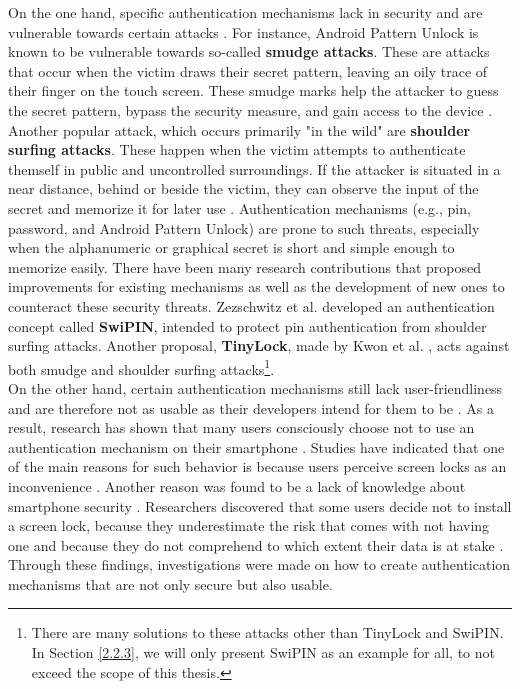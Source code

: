 On the one hand, specific authentication mechanisms lack in security and are vulnerable towards certain attacks \cite{Schloeglhofer}. For instance, Android Pattern Unlock is known to be vulnerable towards so-called \textbf{smudge attacks}. These are attacks that occur when the victim draws their secret pattern, leaving an oily trace of their finger on the touch screen. These smudge marks help the attacker to guess the secret pattern, bypass the security measure, and gain access to the device \cite{ediss20251}. Another popular attack, which occurs primarily "in the wild" are \textbf{shoulder surfing attacks}. These happen when the victim attempts to authenticate themself in public and uncontrolled surroundings. If the attacker is situated in a near distance, behind or beside the victim, they can observe the input of the secret and memorize it for later use \cite{ediss20251}. Authentication mechanisms (e.g., pin, password, and Android Pattern Unlock) are prone to such threats, especially when the alphanumeric or graphical secret is short and simple enough to memorize easily. There have been many research contributions that proposed improvements for existing mechanisms as well as the development of new ones to counteract these security threats. Zezschwitz et al. \cite{vonZezschwitz:2015:SFS:2702123.2702212} developed an authentication concept called \textbf{SwiPIN}, intended to protect pin authentication from shoulder surfing attacks. Another proposal, \textbf{TinyLock}, made by Kwon et al. \cite{kwon}, acts against both smudge and shoulder surfing attacks\footnote{There are many solutions to these attacks other than TinyLock and SwiPIN. In Section \ref{2.2.3}, we will only present SwiPIN as an example for all, to not exceed the scope of this thesis.}.\\

On the other hand, certain authentication mechanisms still lack user-friendliness and are therefore not as usable as their developers intend for them to be \cite{Schloeglhofer}. As a result, research has shown that many users consciously choose not to use an authentication mechanism on their smartphone \cite{ediss20251, Albayram:2017:BUL:3235924.3235929, Egelman:2014:YRL:2660267.2660273}. Studies have indicated that one of the main reasons for such behavior is because users perceive screen locks as an inconvenience \cite{Albayram:2017:BUL:3235924.3235929, ediss20251, harbach}. Another reason was found to be a lack of knowledge about smartphone security \cite{Albayram:2017:BUL:3235924.3235929, Adams:1999:UE:322796.322806}. Researchers discovered that some users decide not to install a screen lock, because they underestimate the risk that comes with not having one and because they do not comprehend to which extent their data is at stake \cite{Egelman:2014:YRL:2660267.2660273}. Through these findings, investigations were made on how to create authentication mechanisms that are not only secure but also usable.

